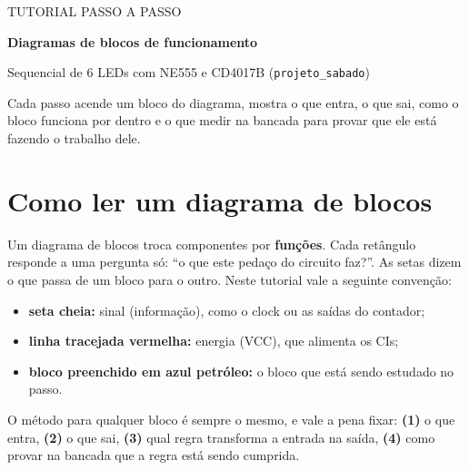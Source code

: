 \documentclass[11pt,a4paper]{article}
\begin{document}
\begin{tcolorbox}[enhanced, colback=petroleo, colframe=petroleo, arc=2mm,
  left=6mm, right=6mm, top=5mm, bottom=5mm]
\color{white}\sffamily
{\small TUTORIAL PASSO A PASSO}\par\vspace{2mm}
{\LARGE\bfseries Diagramas de blocos de funcionamento}\par\vspace{1mm}
{\large Sequencial de 6 LEDs com NE555 e CD4017B (\texttt{projeto\_sabado})}\par\vspace{3mm}
{\small Cada passo acende um bloco do diagrama, mostra o que entra, o que sai, como o
bloco funciona por dentro e o que medir na bancada para provar que ele está fazendo o
trabalho dele.}
\end{tcolorbox}


\tableofcontents

\section{Como ler um diagrama de blocos}
Um diagrama de blocos troca componentes por \textbf{funções}. Cada retângulo responde a
uma pergunta só: “o que este pedaço do circuito faz?”. As setas dizem o que passa de um
bloco para o outro. Neste tutorial vale a seguinte convenção:

\begin{itemize}
  \item \textbf{seta cheia:} sinal (informação), como o clock ou as saídas do contador;
  \item \textbf{linha tracejada vermelha:} energia (VCC), que alimenta os CIs;
  \item \textbf{bloco preenchido em azul petróleo:} o bloco que está sendo estudado no passo.
\end{itemize}

O método para qualquer bloco é sempre o mesmo, e vale a pena fixar: \textbf{(1)} o que
entra, \textbf{(2)} o que sai, \textbf{(3)} qual regra transforma a entrada na saída,
\textbf{(4)} como provar na bancada que a regra está sendo cumprida.
\end{document}
